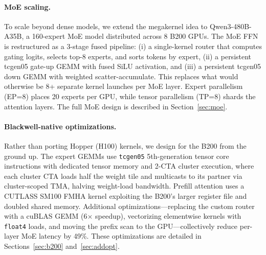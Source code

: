 \documentclass[sigplan,screen]{acmart}
\begin{document}
\paragraph{MoE scaling.}
To scale beyond dense models, we extend the megakernel idea to Qwen3-480B-A35B, a 160-expert MoE model distributed across 8 B200 GPUs. The MoE FFN is restructured as a 3-stage fused pipeline: (i) a single-kernel router that computes gating logits, selects top-8 experts, and sorts tokens by expert, (ii) a persistent tcgen05 gate-up GEMM with fused SiLU activation, and (iii) a persistent tcgen05 down GEMM with weighted scatter-accumulate. This replaces what would otherwise be 8+ separate kernel launches per MoE layer. Expert parallelism (EP=8) places 20 experts per GPU, while tensor parallelism (TP=8) shards the attention layers. The full MoE design is described in Section~\ref{sec:moe}.

\paragraph{Blackwell-native optimizations.}
Rather than porting Hopper (H100) kernels, we design for the B200 from the ground up. The expert GEMMs use \texttt{tcgen05} 5th-generation tensor core instructions with dedicated tensor memory and 2-CTA cluster execution, where each cluster CTA loads half the weight tile and multicasts to its partner via cluster-scoped TMA, halving weight-load bandwidth. Prefill attention uses a CUTLASS SM100 FMHA kernel exploiting the B200's larger register file and doubled shared memory. Additional optimizations---replacing the custom router with a cuBLAS GEMM (6$\times$ speedup), vectorizing elementwise kernels with \texttt{float4} loads, and moving the prefix scan to the GPU---collectively reduce per-layer MoE latency by 49\%. These optimizations are detailed in Sections~\ref{sec:b200} and~\ref{sec:addopt}.
\end{document}
